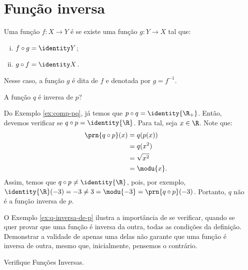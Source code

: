 \section{Função inversa}

\begin{definition}
Uma função $f: X \to Y$ é  se existe uma função $g: Y \to X$ tal que:
%
\begin{enumerate}[(i)]
  \item $f \circ g = \identity Y$;
  \item $g \circ f = \identity X$.
\end{enumerate}
%
Nesse caso, a função $g$ é dita  de $f$ e denotada por $g = f^{-1}$.
\end{definition}

\begin{example}
\label{ex:q-inversa-de-p}
    A função $q$ é inversa de $p$?
\end{example}

\begin{solution}
Do Exemplo \ref{ex:comp-pq}, já temos que $p \circ q = \identity{\R_+}$.
Então, devemos verificar se $q \circ p = \identity{\R}$.
Para tal, seja $x \in \R$. 
Note que:
%
\begin{align*}
    \prn{q \circ p}(x) &= q(p(x)) \\ &= q(x^2) \\ &= \sqrt{x^2} \\ &= \modu{x}.
\end{align*}
%
Assim, temos que $q \circ p \ne \identity{\R}$, pois, por exemplo, $\identity{\R}(-3) = -3 \ne 3 = \modu{-3} = \prn{q \circ p}(-3)$.
Portanto, $q$ não é a função inversa de $p$.
\end{solution}

O Exemplo \ref{ex:q-inversa-de-p} ilustra a importância de se verificar, quando se quer provar que uma função é inversa da outra, todas as condições da definição.
Demonstrar a validade de apenas uma delas não garante que uma função é inversa de outra, mesmo que, inicialmente, pensemos o contrário.

\begin{onlineact}
    {Verifique Funções Inversas}.
\end{onlineact}